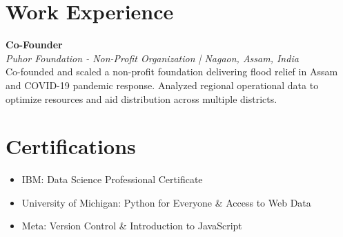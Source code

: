 \documentclass[10pt, a4paper]{article}
\begin{document}
	
	\section{Work Experience}
	\noindent\textbf{Co-Founder} \hfill \\
	\textit{Puhor Foundation - Non-Profit Organization | Nagaon, Assam, India}\\
	Co-founded and scaled a non-profit foundation delivering flood relief in Assam and COVID-19 pandemic response. Analyzed regional operational data to optimize resources and aid distribution across multiple districts.
	
	\section{Certifications}
	\begin{itemize}[leftmargin=0.15in, label=\textbullet]
		\item IBM: Data Science Professional Certificate
		\item University of Michigan: Python for Everyone \& Access to Web Data
		\item Meta: Version Control \& Introduction to JavaScript
	\end{itemize}
	
\end{document}
